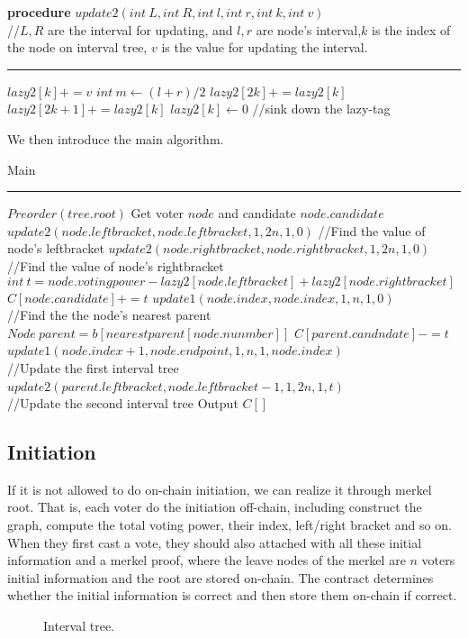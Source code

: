 \begin{algorithm}
	\textbf{procedure} $update2(int~L,int ~R, int~l, int~r, int~k, int~v)${\color{gray}
		\\//$L,R$ are the interval for updating, and $l,r$ are node's interval,$k$ is the index of the node on interval tree, $v$ is the value for updating the interval.}
	\hrule
	{
       $lazy2[k]+=v$
	}
	{
		$int~m \leftarrow (l+r)/2$\;
		$lazy2[2k] += lazy2[k]$\;
		$lazy2[2k+1]+= lazy2[k]$\;
		$lazy2[k] \leftarrow 0$
			{\color{gray}
		//sink down the lazy-tag}\;
    }
\end{algorithm}
We then introduce the main algorithm.
\begin{algorithm}
	\caption{Main}%
	\hrule
	$Preorder(tree.root)$\;
	{
		Get voter $node$ and candidate $node.candidate$\;
		$update2(node.leftbracket,node.leftbracket,1,2n,1,0)${\color{gray}
			//Find the value of node's leftbracket}\;
		$update2(node.rightbracket,node.rightbracket,1,2n,1,0)${\color{gray}
			//Find the value of node's rightbracket}\;
		$int~t=node.votingpower-lazy2[node.leftbracket]+lazy2[node.rightbracket]$\;
		$C[node.candidate]+=t$
		$update1(node.index,node.index,1,n,1,0)${\color{gray}
			\\//Find the the node's nearest parent}\;
		$Node~parent = b[nearestparent[node.nunmber]]$\;
		$C[parent.candndate]-=t$\;
		$update1(node.index+1,node.endpoint,1,n,1,node.index)${\color{gray}
			\\//Update the first interval tree}\;
		$update2(parent.leftbracket,node.leftbracket-1,1,2n,1,t)${\color{gray}
			\\//Update the second interval tree}\;
		Output $C[]$
	}
\end{algorithm}

\subsection{Initiation}
If it is not allowed to do on-chain initiation, we can realize it through merkel root. That is, each voter do the initiation off-chain, including construct the graph, compute the total voting power, their index, left/right bracket and so on. When they first cast a vote, they should also attached with all these initial  information and a merkel proof, where the leave nodes of the merkel are $n$ voters initial information and the root are stored on-chain. The contract determines whether the initial information is correct and then store them on-chain if correct.


\begin{figure}
  \centering
  \label{fig:3}
  
  \caption{Interval tree. }
\end{figure}

